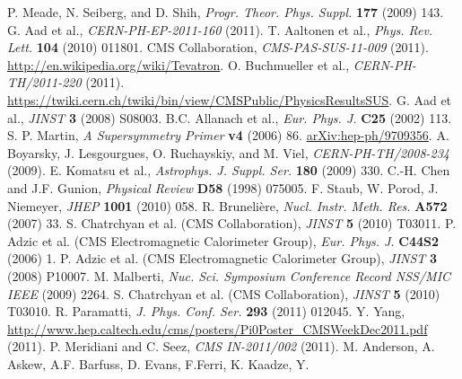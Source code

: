 \documentclass[12pt, letterpaper]{report}
\begin{document}
\begin{thebibliography}{99}
 P. Meade, N. Seiberg, and D. Shih, \textit{Progr. Theor. Phys. Suppl.} \textbf{177} (2009) 143.
 G. Aad et al., \textit{CERN-PH-EP-2011-160} (2011).
 T. Aaltonen et al., \textit{Phys. Rev. Lett.} \textbf{104} (2010) 011801.
 CMS Collaboration, \textit{CMS-PAS-SUS-11-009} (2011).
 \url{http://en.wikipedia.org/wiki/Tevatron}.
 O. Buchmueller et al., \textit{CERN-PH-TH/2011-220} (2011).
 \url{https://twiki.cern.ch/twiki/bin/view/CMSPublic/PhysicsResultsSUS}.
 G. Aad et al., \textit{JINST} \textbf{3} (2008) S08003.
 B.C. Allanach et al., \textit{Eur. Phys. J.} \textbf{C25} (2002) 113.
 S. P. Martin, \textit{A Supersymmetry Primer} \textbf{v4} (2006) 86.  \href{http://arxiv.org/abs/hep-ph/9709356}{arXiv:hep-ph/9709356}.
 A. Boyarsky, J. Lesgourgues, O. Ruchayskiy, and M. Viel, \textit{CERN-PH-TH/2008-234} (2009).
 E. Komatsu et al., \textit{Astrophys. J. Suppl. Ser.} \textbf{180} (2009) 330.
 C.-H. Chen and J.F. Gunion, \textit{Physical Review} \textbf{D58} (1998) 075005.
 F. Staub, W. Porod, J. Niemeyer, \textit{JHEP} \textbf{1001} (2010) 058.
 R. Bruneli\`ere, \textit{Nucl. Instr. Meth. Res.} \textbf{A572} (2007) 33.
 S. Chatrchyan et al. (CMS Collaboration), \textit{JINST} \textbf{5} (2010) T03011.
 P. Adzic et al. (CMS Electromagnetic Calorimeter Group), \textit{Eur. Phys. J.} \textbf{C44S2} (2006) 1.
 P. Adzic et al. (CMS Electromagnetic Calorimeter Group), \textit{JINST} \textbf{3} (2008) P10007.
 M. Malberti, \textit{Nuc. Sci. Symposium Conference Record NSS/MIC IEEE} (2009) 2264.
 S. Chatrchyan et al. (CMS Collaboration), \textit{JINST} \textbf{5} (2010) T03010.
 R. Paramatti, \textit{J. Phys. Conf. Ser.} \textbf{293} (2011) 012045.
 Y. Yang, \url{http://www.hep.caltech.edu/cms/posters/Pi0Poster_CMSWeekDec2011.pdf} (2011).
 P. Meridiani and C. Seez, \textit{CMS IN-2011/002} (2011).
 M. Anderson, A. Askew, A.F. Barfuss, D. Evans, F.Ferri, K. Kaadze, Y. 

\end{thebibliography}
\end{document}
